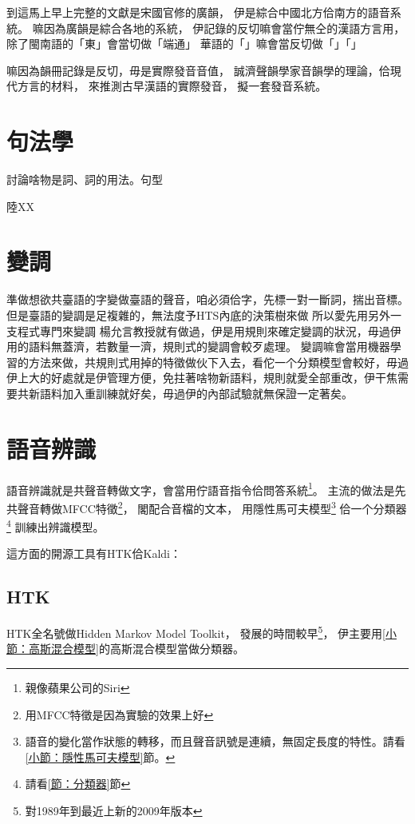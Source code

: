 到這馬上早上完整的文獻是宋國官修的廣韻\cite{廣韻}，
伊是綜合中國北方佮南方的語音系統。
嘛因為廣韻是綜合各地的系統，
伊記錄的反切嘛會當佇無仝的漢語方言用，
除了閩南語的「東」會當切做「端通」
華語的「」嘛會當反切做「」「」

嘛因為韻冊記錄是反切，毋是實際發音音值，
誠濟聲韻學家音韻學的理論，佮現代方言的材料，
來推測古早漢語的實際發音，
擬一套發音系統。



\section{句法學}
\label{節：句法學}
討論啥物是詞、詞的用法。句型

陸XX

\section{變調}
\label{節：變調}

準做想欲共臺語的字變做臺語的聲音，咱必須佮字，先標一對一斷詞，揣出音標。
但是臺語的變調是足複雜的，無法度予HTS內底的決策樹來做
所以愛先用另外一支程式專門來變調
楊允言教授就有做過\cite{楊允言變調}，伊是用規則來確定變調的狀況，毋過伊用的語料無蓋濟，若數量一濟，規則式的變調會較歹處理。
變調嘛會當用機器學習的方法來做，共規則式用掉的特徵做伙下入去，看佗一个分類模型會較好，毋過伊上大的好處就是伊管理方便，免拄著啥物新語料，規則就愛全部重改，伊干焦需要共新語料加入重訓練就好矣，毋過伊的內部試驗就無保證一定著矣。

\section{語音辨識}
\label{節：語音辨識}
語音辨識就是共聲音轉做文字，會當用佇語音指令佮問答系統\footnote{親像蘋果公司的Siri}。
主流的做法是先共聲音轉做MFCC特徵\footnote{用MFCC特徵\cite{MFCC特徵}是因為實驗的效果上好\cite{MFCC上好}}，
閣配合音檔的文本，
用隱性馬可夫模型\footnote{語音的變化當作狀態的轉移，而且聲音訊號是連續，無固定長度的特性。請看\ref{小節：隱性馬可夫模型}節。}
佮一个分類器\footnote{請看\ref{節：分類器}節}
訓練出辨識模型。

這方面的開源工具有HTK佮Kaldi：

\subsection{HTK}
\label{小節：HTK}
HTK全名號做Hidden Markov Model Toolkit\cite{HTK網頁}，
發展的時間較早\footnote{對1989年到最近上新的2009年版本}，
伊主要用\ref{小節：高斯混合模型}的高斯混合模型當做分類器。

